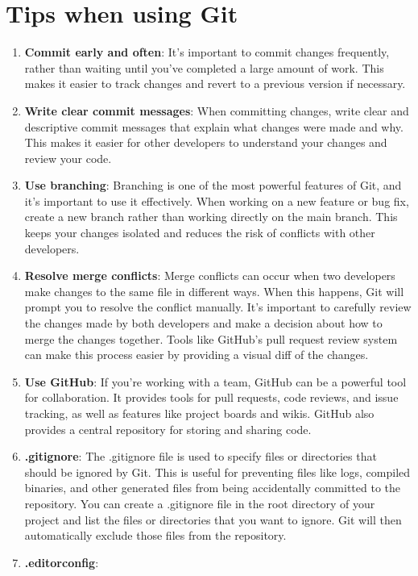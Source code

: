 \documentclass[10pt, a4paper]{article}
\begin{document}
\section*{Tips when using Git}
\begin{enumerate}
    \item \textbf{Commit early and often}:
    It's important to commit changes frequently, rather than waiting until you've completed a large amount of work. This makes it easier to track changes and revert to a previous version if necessary.
    \item \textbf{Write clear commit messages}:
    When committing changes, write clear and descriptive commit messages that explain what changes were made and why. This makes it easier for other developers to understand your changes and review your code.
    \item \textbf{Use branching}:
    Branching is one of the most powerful features of Git, and it's important to use it effectively. When working on a new feature or bug fix, create a new branch rather than working directly on the main branch. This keeps your changes isolated and reduces the risk of conflicts with other developers.
    \item \textbf{Resolve merge conflicts}:
    Merge conflicts can occur when two developers make changes to the same file in different ways. When this happens, Git will prompt you to resolve the conflict manually. It's important to carefully review the changes made by both developers and make a decision about how to merge the changes together. Tools like GitHub's pull request review system can make this process easier by providing a visual diff of the changes.
    \item \textbf{Use GitHub}:
    If you're working with a team, GitHub can be a powerful tool for collaboration. It provides tools for pull requests, code reviews, and issue tracking, as well as features like project boards and wikis. GitHub also provides a central repository for storing and sharing code.
    \item \textbf{.gitignore}:
    The .gitignore file is used to specify files or directories that should be ignored by Git. This is useful for preventing files like logs, compiled binaries, and other generated files from being accidentally committed to the repository. You can create a .gitignore file in the root directory of your project and list the files or directories that you want to ignore. Git will then automatically exclude those files from the repository.
    \item \textbf{.editorconfig}:

\end{enumerate}
\end{document}
